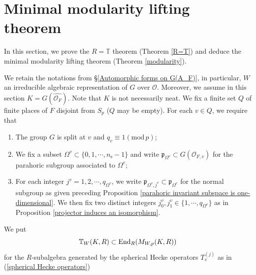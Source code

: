 \documentclass[12pt,oneside,reqno]{amsart}
\theoremstyle{plain}
\begin{document}
	
	
	
	
	
	
	
	
	
	
	
	
	
	
	
	
	\section{Minimal modularity lifting theorem}\label{modularity lifting}	
	In this section, we prove the $R=\mathbb{T}$ theorem (Theorem \ref{R=T}) and deduce the minimal modularity lifting theorem (Theorem \ref{modularity}).
	
	
	
	
	We retain the notations from
	§\ref{Automorphic forms on G(A_F)}, in particular, $W$ an irreducible algebraic representation of
	$ G$ over
	$\mathcal{O}$.
	Moreover, we assume in this section $K=G(\widehat{\mathcal{O}_F})$.
	Note that $K$ is not necessarily neat.
	We fix a finite set $Q$
	of finite places of $F$ disjoint from $S_p$
	($Q$ may be empty).
	For each $v\in Q$,
	we require that
	\begin{enumerate}
		\item 
		The group $G$ is split at $v$ and $q_v\equiv1(\mathrm{mod}\,p)$;
		
		
		
		\item 
		We fix a subset
		$\Omega^v\subset
		\{0,1,\cdots,n_\mathrm{s}-1\}$
		and write
		$\mathfrak{p}_{\Omega^v}
		\subset
		G(\mathcal{O}_{F,v})$
		for the parahoric subgroup associated to $\Omega^v$;
		
		
		\item 
		For each integer
		$j^v=1,2,\cdots,q_{\Omega^v}$,
		we write
		$\mathfrak{p}_{\Omega^v,j^v}
		\subset
		\mathfrak{p}_{\Omega^v}$
		for the normal subgroup as given preceding
		Proposition
		\ref{parahoric invariant subspace is one-dimensional}.
		We then fix two distinct integers
		$j_0^v,j_1^v\in\{1,\cdots,q_{\Omega^v}\}$
		as in
		Proposition
		\ref{projector induces an isomorphism}.
	\end{enumerate}
	We put
	\begin{equation}\label{T_W(K,R)}
		\mathbb{T}_{W}(K,R)
		\subset
		\mathrm{End}_R
		(M_{W,p}(K,R))
		\index{T@$\mathbb{T}_W(K,R)$}
	\end{equation}
	for the $R$-subalgebra
	generated by the spherical
	Hecke operators
	$T_v^{(j)}$
	as in
	(\ref{spherical Hecke operators})
\end{document}
